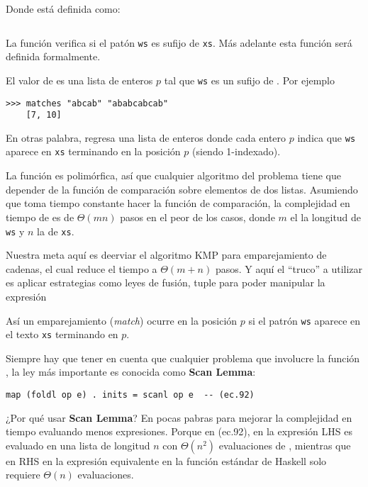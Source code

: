 Donde  está definida como:

\inputminted{haskell}{definiciones/inits.hs}

La función  verifica si el patón \texttt{ws} es sufijo de \texttt{xs}. Más adelante esta función será definida formalmente.

El valor de  es una lista de enteros $p$ tal que \texttt{ws} es un sufijo de . Por ejemplo

\begin{verbatim}
>>> matches "abcab" "ababcabcab" 
    [7, 10]
\end{verbatim}

En otras palabra,  regresa una lista de enteros donde cada entero $p$ indica que
\texttt{ws} aparece en \texttt{xs} terminando en la posición $p$ (siendo 1-indexado).

La función  es polimórfica, así que cualquier algoritmo del problema tiene que
depender de la función de comparación  sobre elementos de dos listas.
Asumiendo que toma tiempo constante hacer la función de comparación, la complejidad en tiempo de
 es de $\Theta(mn)$ pasos en el peor de los casos, donde $m$ el la longitud de \texttt{ws} y $n$ la
de \texttt{xs}.

Nuestra meta aquí es deerviar el algoritmo KMP para emparejamiento de cadenas, el cual reduce el tiempo a $\Theta(m+n)$ pasos.
Y aquí el ``truco'' a utilizar es aplicar estrategias como leyes de fusión, tuple %
para poder manipular la expresión %

Así un emparejamiento (\textit{match}) ocurre en la posición $p$ si el patrón \texttt{ws} aparece en el texto \texttt{xs} terminando en $p$.


Siempre hay que tener en cuenta que cualquier problema que involucre la función , la ley más importante es conocida como \textbf{Scan Lemma}: %
\begin{verbatim}
map (foldl op e) . inits = scanl op e  -- (ec.92)
\end{verbatim}

¿Por qué usar \textbf{Scan Lemma}? En pocas pabras para mejorar la complejidad en tiempo evaluando menos expresiones.
Porque en (ec.92), en la expresión LHS es evaluado en una lista de longitud $n$ con $\Theta(n^2)$ evaluaciones de , mientras que
en RHS en la expresión equivalente en la función estándar de Haskell  solo requiere $\Theta(n)$ evaluaciones.

